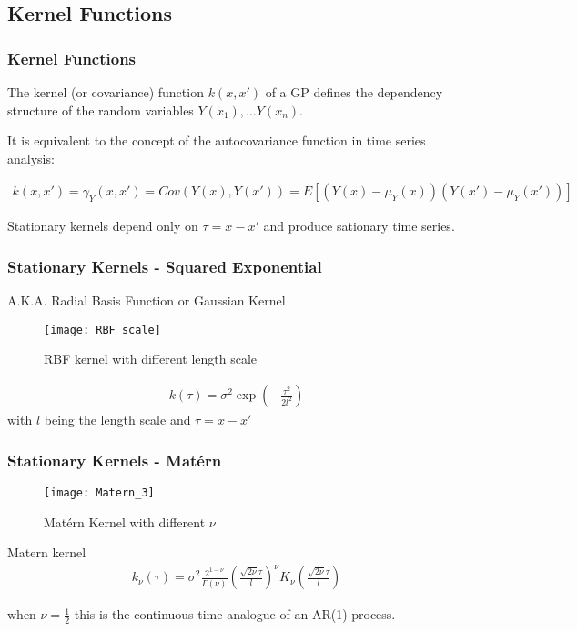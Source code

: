 \documentclass[
	9pt, %
]{beamer}
\begin{document}
\subsection{Kernel Functions}

\begin{frame}
	\frametitle{Kernel Functions}


	The kernel (or covariance) function $k(x,x')$ of a GP defines the dependency structure
	of the random variables $Y(x_1), \dots Y(x_n)$.
	\bigskip %

	It is equivalent to the concept of the autocovariance function in time series analysis:

	\begin{gather*}
    k(x, x') = \gamma_Y(x,x') = Cov(Y(x), Y(x')) = E[(Y(x) - \mu_Y(x))(Y(x')-\mu_Y(x'))]
	\end{gather*}

	\bigskip %


	Stationary kernels depend only on $\tau = x-x'$ and produce sationary time series.


\end{frame}

\begin{frame}
	\frametitle{Stationary Kernels - Squared Exponential}

	A.K.A. Radial Basis Function or Gaussian Kernel

	\begin{figure}
			\texttt{[image: RBF\_scale]}
			\caption{RBF kernel with different length scale}
	\end{figure}

	\begin{gather*}
    k(\tau) = \sigma^2 \exp(-\frac{\tau^2}{2 l^2})
	\end{gather*}
	with $l$ being the length scale and $\tau = x-x'$
\end{frame}

\begin{frame}
	\frametitle{Stationary Kernels - Matérn}


	\begin{figure}
			\texttt{[image: Matern\_3]}
			\caption{Matérn Kernel with different $\nu$}
	\end{figure}

	Matern kernel
	\begin{gather*}
    k_{\nu}(\tau) = \sigma^2 \frac{2^{1-\nu}}{\Gamma(\nu)}(\frac{\sqrt{2\nu} \tau}{l})^{\nu} K_{\nu}
    (\frac{\sqrt{2\nu} \tau}{l})
	\end{gather*}

	when $\nu = \frac{1}{2}$ this is the continuous time analogue of an AR(1) process.

\end{frame}
\end{document}
